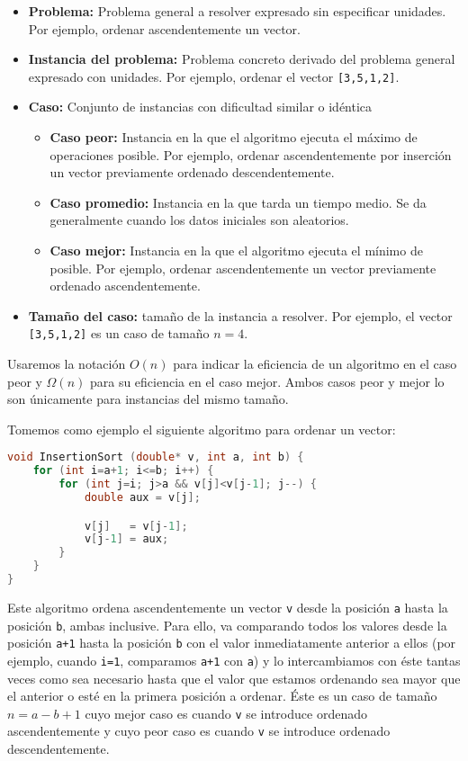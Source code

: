 \begin{itemize}
	\item\textbf{Problema:} Problema general a resolver expresado sin especificar unidades. Por ejemplo, ordenar ascendentemente un vector.
	\item\textbf{Instancia del problema:} Problema concreto derivado del problema general expresado con unidades. Por ejemplo, ordenar el vector \texttt{[3,5,1,2]}.

\pagebreak

	\item\textbf{Caso:} Conjunto de instancias con dificultad similar o idéntica
	\begin{itemize}
		\item\textbf{Caso peor:} Instancia en la que el algoritmo ejecuta el máximo de operaciones posible. Por ejemplo, ordenar ascendentemente por inserción un vector previamente ordenado descendentemente.
		\item\textbf{Caso promedio:} Instancia en la que tarda un tiempo medio. Se da generalmente cuando los datos iniciales son aleatorios.
		\item\textbf{Caso mejor:} Instancia en la que el algoritmo ejecuta el mínimo de posible. Por ejemplo, ordenar ascendentemente un vector previamente ordenado ascendentemente.
	\end{itemize}
	\item\textbf{Tamaño del caso:} tamaño de la instancia a resolver. Por ejemplo, el vector \texttt{[3,5,1,2]} es un caso de tamaño $n=4$.
\end{itemize}

Usaremos la notación $O(n)$ para indicar la eficiencia de un algoritmo en el caso peor y $\Omega(n)$ para su eficiencia en el caso mejor.
Ambos casos peor y mejor lo son únicamente para instancias del mismo tamaño.

Tomemos como ejemplo el siguiente algoritmo para ordenar un vector:

\begin{lstlisting}[language=C++]
void InsertionSort (double* v, int a, int b) {
	for (int i=a+1; i<=b; i++) {
		for (int j=i; j>a && v[j]<v[j-1]; j--) {
			double aux = v[j];

			v[j]   = v[j-1];
			v[j-1] = aux;
		}
	}
}
\end{lstlisting}

Este algoritmo ordena ascendentemente un vector \texttt{v} desde la posición \texttt{a} hasta la posición \texttt{b}, ambas inclusive.
Para ello, va comparando todos los valores desde la posición \texttt{a+1} hasta la posición \texttt{b} con el valor inmediatamente anterior a ellos (por ejemplo, cuando \texttt{i=1}, comparamos \texttt{a+1} con \texttt{a}) y lo intercambiamos con éste tantas veces como sea necesario hasta que el valor que estamos ordenando sea mayor que el anterior o esté en la primera posición a ordenar.
Éste es un caso de tamaño $n=a-b+1$ cuyo mejor caso es cuando \texttt{v} se introduce ordenado ascendentemente y cuyo peor caso es cuando \texttt{v} se introduce ordenado descendentemente.

